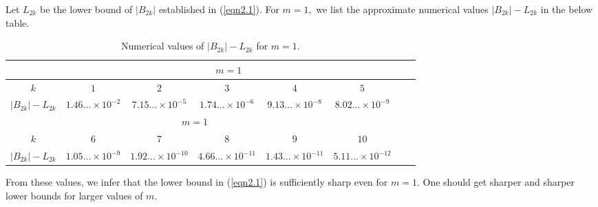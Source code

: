 \documentclass[eqnumis, pdf]{yjb}
\begin{document}
Let $L_{2k} $ be the lower bound of $ \vert B_{2k} \vert $ established in (\ref{eqn2.1}). For $ m = 1, $ we list the approximate numerical values $ \vert B_{2k} \vert - L_{2k}$ in the below table.

{
\begin{table}[H]
\centering
\caption{ Numerical values of $ \vert B_{2k} \vert - L_{2k}$ for $ m = 1.$ }
\vspace{.5cm}
{\renewcommand{\arraystretch}{2}
{\small
\begin{tabular}{c|c|c|c|c|c|c|c|}
\cline{2-6}
& \multicolumn{5}{|c|}{$ m = 1 $}  \\ \hline
\multicolumn{1}{|c|}{$k$} &$ 1 $ &$ 2  $ &$ 3$ &$4 $ & $5$  \\\hline
\multicolumn{1}{|c|}{$\vert B_{2k} \vert - L_{2k}$} & $ 1.46... \times 10^{-2}$  &$ 7.15... \times 10^{-5} $  &$  1.74... \times 10^{-6} $  &$  9.13... \times 10^{-8}  $ & $ 8.02... \times 10^{-9}$   \\ \hline
\cline{2-6}
& \multicolumn{4}{|c|}{$ m = 1$}    \\ \hline
\multicolumn{1}{|c|}{$k$} &$6$ &$7$ &$ 8$ &$9 $ & $10$  \\
\hline
\multicolumn{1}{|c|}{$\vert B_{2k} \vert - L_{2k}$} & $1.05... \times 10^{-9}$  &$ 1.92... \times 10^{-10} $  &$ 4.66... \times 10^{-11} $  &$ 1.43... \times 10^{-11} $ & $5.11... \times 10^{-12}$   \\
\hline
\end{tabular}
}}
\label{tab1}
\end{table}
}

From these values, we infer that the lower bound in (\ref{eqn2.1}) is sufficiently sharp even for $ m=1.$ One should get sharper and sharper lower bounds for larger values of $m.$
\end{document}
